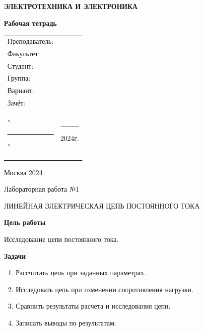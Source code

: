 \documentclass[12pt, a4paper]{report}
\begin{document}
	\begin{titlepage}
		\begin{center}
			\vspace*{5cm}
			\Huge \textbf{ЭЛЕКТРОТЕХНИКА И ЭЛЕКТРОНИКА}

			\vspace{1cm}
			\Huge \textbf{Рабочая тетрадь}
			
			\vspace{5cm}
			\begin{flushright}
				\Large
				\begin{tabular}{>{\raggedleft\arraybackslash}p{5cm} p{8cm}}
					Преподаватель: & \hrulefill \\
					Факультет: & \hrulefill \\
					\large Студент: & \hrulefill \\
					\large Группа: & \hrulefill \\
					\large Вариант: & \hrulefill \\
					\large Зачёт: & \hrulefill \\
					\large "\rule{1cm}{0.5pt}" & \rule{5cm}{0.5pt} 2024г. \\
				\end{tabular}
			\end{flushright}

			\vspace*{\fill}
			\Large Москва 2024
		\end{center}
	\end{titlepage}
	

	\begin{center}
		Лабораторная работа №1
		
		\large ЛИНЕЙНАЯ ЭЛЕКТРИЧЕСКАЯ ЦЕПЬ ПОСТОЯННОГО ТОКА	

		\textbf{Цель работы}
	\end{center}
	\par Исследование цепи постоянного тока.

	\begin{center}
		\textbf{Задачи}
	\end{center}
	\begin{enumerate}
		\item Рассчитать цепь при заданных параметрах.
		\item Исследовать цепь при изменении сопротивления нагрузки.
		\item Сравнить результаты расчета и исследования цепи.
		\item Записать выводы по результатам.
	\end{enumerate}
\end{document}
